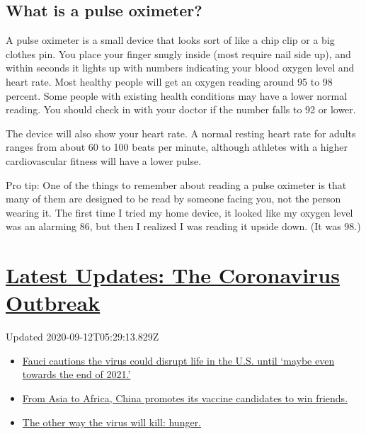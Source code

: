 \hypertarget{what-is-a-pulse-oximeter}{%
\subsection{What is a pulse oximeter?}\label{what-is-a-pulse-oximeter}}

A pulse oximeter is a small device that looks sort of like a chip clip
or a big clothes pin. You place your finger snugly inside (most require
nail side up), and within seconds it lights up with numbers indicating
your blood oxygen level and heart rate. Most healthy people will get an
oxygen reading around 95 to 98 percent. Some people with existing health
conditions may have a lower normal reading. You should check in with
your doctor if the number falls to 92 or lower.

The device will also show your heart rate. A normal resting heart rate
for adults ranges from about 60 to 100 beats per minute, although
athletes with a higher cardiovascular fitness will have a lower pulse.

Pro tip: One of the things to remember about reading a pulse oximeter is
that many of them are designed to be read by someone facing you, not the
person wearing it. The first time I tried my home device, it looked like
my oxygen level was an alarming 86, but then I realized I was reading it
upside down. (It was 98.)

\hypertarget{latest-updates-the-coronavirus-outbreak}{%
\section{\texorpdfstring{\href{https://www.nytimes3xbfgragh.onion/2020/09/11/world/covid-19-coronavirus.html?action=click\&pgtype=Article\&state=default\&region=MAIN_CONTENT_1\&context=storylines_live_updates}{Latest
Updates: The Coronavirus
Outbreak}}{Latest Updates: The Coronavirus Outbreak}}\label{latest-updates-the-coronavirus-outbreak}}

Updated 2020-09-12T05:29:13.829Z

\begin{itemize}
\tightlist
\item
  \href{https://www.nytimes3xbfgragh.onion/2020/09/11/world/covid-19-coronavirus.html?action=click\&pgtype=Article\&state=default\&region=MAIN_CONTENT_1\&context=storylines_live_updates\#link-dfb8a16}{Fauci
  cautions the virus could disrupt life in the U.S. until `maybe even
  towards the end of 2021.'}
\item
  \href{https://www.nytimes3xbfgragh.onion/2020/09/11/world/covid-19-coronavirus.html?action=click\&pgtype=Article\&state=default\&region=MAIN_CONTENT_1\&context=storylines_live_updates\#link-7104d154}{From
  Asia to Africa, China promotes its vaccine candidates to win friends.}
\item
  \href{https://www.nytimes3xbfgragh.onion/2020/09/11/world/covid-19-coronavirus.html?action=click\&pgtype=Article\&state=default\&region=MAIN_CONTENT_1\&context=storylines_live_updates\#link-393ad215}{The
  other way the virus will kill: hunger.}
\end{itemize}

